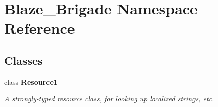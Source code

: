 \hypertarget{namespace_blaze___brigade}{}\section{Blaze\+\_\+\+Brigade Namespace Reference}
\label{namespace_blaze___brigade}
\subsection*{Classes}
\begin{DoxyCompactItemize}
\item 
class {\bfseries Resource1}
\begin{DoxyCompactList}\small\item\em A strongly-\/typed resource class, for looking up localized strings, etc. \end{DoxyCompactList}\end{DoxyCompactItemize}
